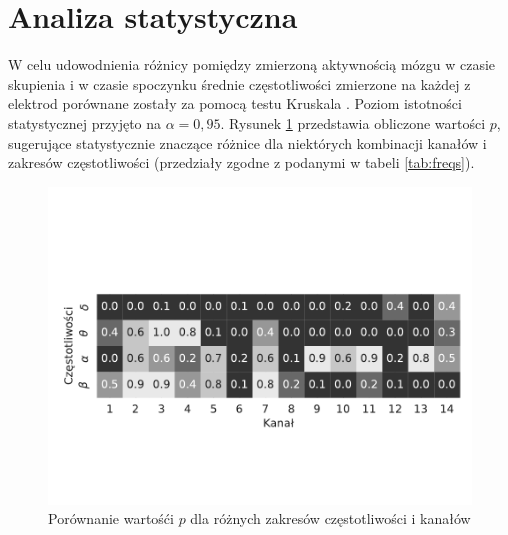 \documentclass{./assets/wfis}
\begin{document}
\section{Analiza statystyczna}\label{analiza-klasyczna}
W celu udowodnienia różnicy pomiędzy zmierzoną aktywnością mózgu w czasie skupienia i w czasie spoczynku średnie częstotliwości zmierzone na każdej z elektrod porównane zostały za pomocą testu Kruskala \cite{noauthor_scipystatskruskal_nodate}. Poziom istotności statystycznej przyjęto na $\alpha=0,95$. Rysunek \ref{fig:thinking-vs-waiting-pvalue} przedstawia obliczone wartości $p$, sugerujące statystycznie znaczące różnice dla niektórych kombinacji kanałów i zakresów częstotliwości (przedziały zgodne z podanymi w tabeli \ref{tab:freqs}).
\begin{figure}[h!]
    \centering
    \includegraphics[width=\columnwidth,trim={0 2.9cm 0 4cm}, clip]{plots/pvalue.pdf}
    \caption{Porównanie wartośći $p$ dla różnych zakresów częstotliwości i kanałów}
    \label{fig:thinking-vs-waiting-pvalue}
\end{figure}
\end{document}
